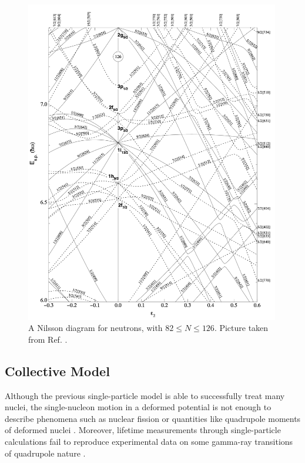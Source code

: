 \begin{figure}
    \centering
    \includegraphics[width=0.99\textwidth]{Chapters/Figures/nillson_diagram_2.png}
    \caption{A Nilsson diagram for neutrons, with $82\leq N\leq126$. Picture taken from Ref. \cite{ragnarsson2005shapes}.}
    \label{nillson-diagram-2}
\end{figure}

\pagebreak

\subsection{Collective Model}
\label{subsection-collective-model}

Although the previous single-particle model is able to successfully treat many nuclei, the single-nucleon motion in a deformed potential is not enough to describe phenomena such as nuclear fission or quantities like quadrupole moments of deformed nuclei \cite{townes1949nuclear}. Moreover, lifetime measurements through single-particle calculations fail to reproduce experimental data on some gamma-ray transitions of quadrupole nature \cite{goldhaber1951classification}.


